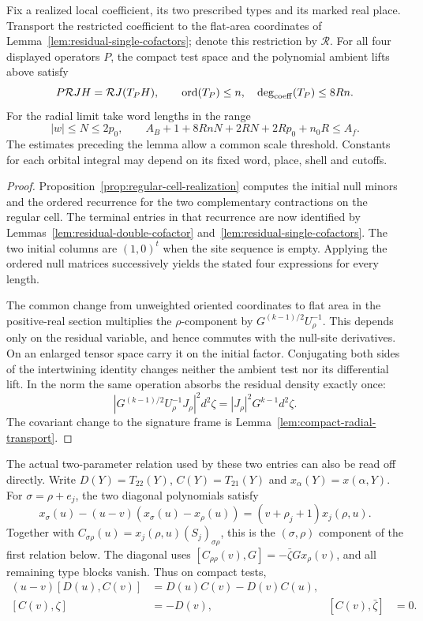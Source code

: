 \begin{auxlemma}\label{hyp:selected-orbital-coefficient-bounds}
Fix a realized local coefficient, its two prescribed types and its
marked real place. Transport the restricted coefficient to the
flat-area coordinates of Lemma~\ref{lem:residual-single-cofactors};
denote this restriction by \(\mathcal R\). For all four displayed
operators \(P\), the compact test space and the polynomial ambient
lifts above satisfy
\[
          P\mathcal R JH=\mathcal R J(T_P H),\qquad
          \operatorname{ord}(T_P)\le n,\quad
          \deg_{\rm coeff}(T_P)\le8Rn .
\]
For the radial limit take word lengths in the range
\[
       |w|\le N\le2p_0,\qquad
       A_B+1+8RnN+2RN+2Rp_0+n_0R\le A_f .
\]
The estimates preceding the lemma allow a common scale threshold.
Constants for each orbital integral may depend on its fixed word,
place, shell and cutoffs.
\end{auxlemma}
\begin{proof}
Proposition~\ref{prop:regular-cell-realization} computes the
initial null minors and the ordered recurrence for the two
complementary contractions on the regular cell. The terminal
entries in that recurrence are now identified by
Lemmas~\ref{lem:residual-double-cofactor}
and~\ref{lem:residual-single-cofactors}.
The two initial columns are \((1,0)^t\) when the site sequence
is empty. Applying the ordered null matrices successively yields
the stated four expressions for every length.

The common change from unweighted oriented coordinates to flat area
in the positive-real section multiplies the \(\rho\)-component by
\(G^{(k-1)/2}U_\rho^{-1}\). This depends only on the residual
variable, and hence commutes with the null-site derivatives.
On an enlarged tensor space carry it on the initial factor.
Conjugating both sides of the intertwining identity changes neither
the ambient test nor its differential lift. In the norm the same
operation absorbs the residual density exactly once:
\[
    |G^{(k-1)/2}U_\rho^{-1}J_\rho|^2d^2\zeta
             =|J_\rho|^2G^{k-1}d^2\zeta .
\]
The covariant change to the signature frame is
Lemma~\ref{lem:compact-radial-transport}.
\end{proof}

The actual two-parameter relation used by these two entries can
also be read off directly. Write \(D(Y)=T_{22}(Y)\),
\(C(Y)=T_{21}(Y)\) and \(x_\alpha(Y)=x(\alpha,Y)\).
For \(\sigma=\rho+e_j\), the two diagonal polynomials satisfy
\[
 x_\sigma(u)-(u-v)(x_\sigma(u)-x_\rho(u))
            =(v+\rho_j+1)x_j(\rho,u).
\]
Together with \(C_{\sigma\rho}(u)=x_j(\rho,u)(S_j)_{\sigma\rho}\),
this is the \((\sigma,\rho)\) component of the first relation below.
The diagonal uses
\([C_{\rho\rho}(v),G]=-\bar\zeta Gx_\rho(v)\), and all remaining
type blocks vanish. Thus on compact tests,
\begin{equation}\label{eq:residual-entry-test}
 \begin{aligned}
 (u-v)[D(u),C(v)]&=D(u)C(v)-D(v)C(u),\\
 [C(v),\zeta]&=-D(v),& [C(v),\bar\zeta]&=0 .
 \end{aligned}
\end{equation}

